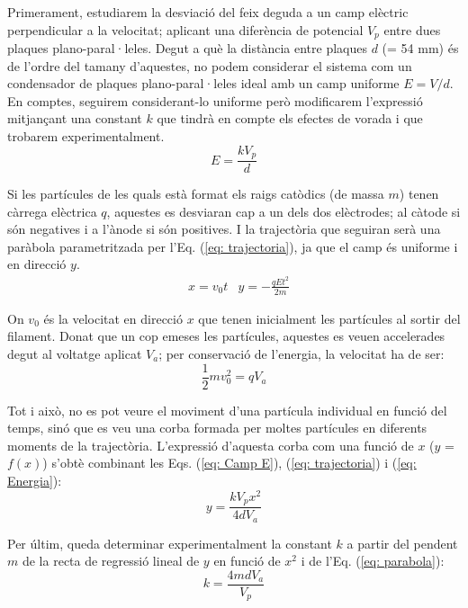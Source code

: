 \documentclass[11pt]{article}
\numberwithin{equation}{section}
\numberwithin{figure}{section}
\numberwithin{table}{section}
\begin{document}
Primerament, estudiarem la desviació del feix deguda a un camp elèctric perpendicular a la velocitat; aplicant una diferència de potencial $V_p$ entre dues plaques plano-paral·leles. Degut a què la distància entre plaques $d$ (= 54 mm) és de l'ordre del tamany d'aquestes, no podem considerar el sistema com un condensador de plaques plano-paral·leles ideal amb un camp uniforme $E=V/d$. En comptes, seguirem considerant-lo uniforme però modificarem l'expressió mitjançant una constant $k$ que tindrà en compte els efectes de vorada i que trobarem experimentalment.
\begin{equation}
    E = \frac{kV_p}{d}
    \label{eq: Camp E}
\end{equation}

Si les partícules de les quals està format els raigs catòdics (de massa $m$) tenen càrrega elèctrica $q$, aquestes es desviaran cap a un dels dos elèctrodes; al càtode si són negatives i a l'ànode si són positives. I la trajectòria que seguiran serà una paràbola parametritzada per l'Eq. (\ref{eq: trajectoria}), ja que el camp és uniforme i en direcció $y$.
\begin{align}    \label{eq: trajectoria}
    &x = v_0 t      &y = -\frac{qEt^2}{2m}
\end{align}

On $v_0$ és la velocitat en direcció $x$ que tenen inicialment les partícules al sortir del filament.
Donat que un cop emeses les partícules, aquestes es veuen accelerades degut al voltatge aplicat $V_a$; per conservació de l'energia, la velocitat ha de ser:
\begin{equation}
    \frac{1}{2}mv_0^2=qV_a
    \label{eq: Energia}
\end{equation}

Tot i això, no es pot veure el moviment d'una partícula individual en funció del temps, sinó que es veu una corba formada per moltes partícules en diferents moments de la trajectòria. L'expressió d'aquesta corba com una funció de $x$ ($y$ = $f(x)$)  s'obtè combinant les Eqs. (\ref{eq: Camp E}), (\ref{eq: trajectoria}) i (\ref{eq: Energia}):
\begin{equation}
    y = \frac{kV_px^2}{4dV_a}
    \label{eq: parabola}
\end{equation}

Per últim, queda determinar experimentalment la constant $k$ a partir del pendent $m$ de la recta de regressió lineal de $y$ en funció de $x^2$ i de l'Eq. (\ref{eq: parabola}):
 \begin{equation}
      k =\frac{4mdV_a}{V_p}
      \label{eq: k}
 \end{equation}
\end{document}
